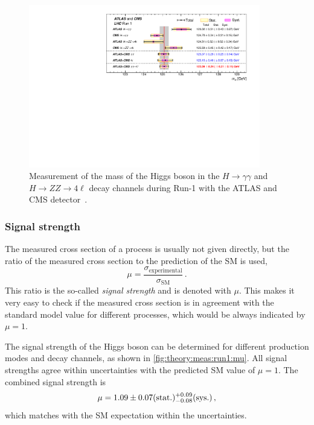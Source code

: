 \begin{figure}[htb]
    \centering
    \includegraphics[width=0.9\textwidth]{./figures/theory/mass_combination_atlascms.pdf}
    \caption{Measurement of the mass of the Higgs boson in the $H\to\gamma\gamma$ and $H \to ZZ \to 4\ell$ decay channels during Run-1 with the ATLAS and CMS detector~\cite{MassCombinedMeas}.}\label{fig:theory:meas:run1:mass}
\end{figure}

\subsubsection{Signal strength}\label{subsub:theory:meas:run1:mu}

The measured cross section of a process is usually not given directly, but the ratio of the measured cross section
to the prediction of the SM is used,
\begin{equation}
    \label{eq:theo:mu}
    \mu = \frac{\sigma_\text{experimental}}{\sigma_\text{SM}} \,.
\end{equation}
This ratio is the so-called \emph{signal strength} and is denoted with $\mu$.
This makes it very easy to check if the measured cross section is in agreement with the standard model value for different processes, which would be
always indicated by $\mu = 1$.

The signal strength of the Higgs boson can be determined for different production modes and decay channels, as shown in \cref{fig:theory:meas:run1:mu}.
All signal strengths agree within uncertainties with the predicted SM value of $\mu = 1$.
The combined signal strength is~\cite{HiggsMuCombined}
\begin{equation}
    \mu = 1.09 \pm  0.07 \text{(stat.)} {}^{+{0.09}}_{-{0.08}} \text{(sys.)} \,,
\end{equation}
which matches with the SM expectation within the uncertainties.

